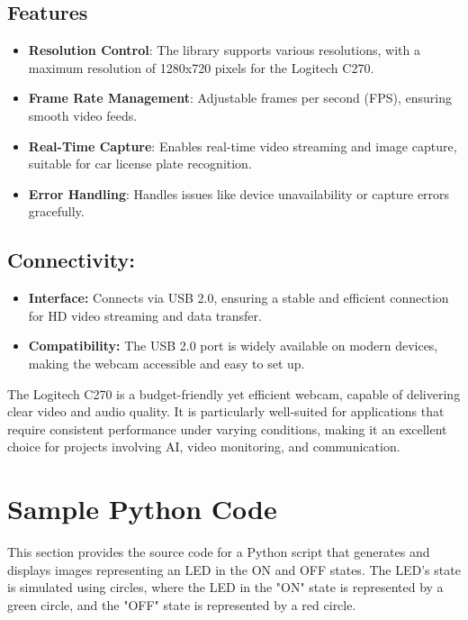 \subsection{Features}

\begin{itemize}
	\item \textbf{Resolution Control}: The library supports various resolutions, with a maximum resolution of 1280x720 pixels for the Logitech C270.
	\item \textbf{Frame Rate Management}: Adjustable frames per second (FPS), ensuring smooth video feeds.
	\item \textbf{Real-Time Capture}: Enables real-time video streaming and image capture, suitable for car license plate recognition.
	\item \textbf{Error Handling}: Handles issues like device unavailability or capture errors gracefully.
\end{itemize}

\subsection{Connectivity:}
\begin{itemize}
	\item \textbf{Interface:} Connects via USB 2.0, ensuring a stable and efficient connection for HD video streaming and data transfer.
	
	\item \textbf{Compatibility:} The USB 2.0 port is widely available on modern devices, making the webcam accessible and easy to set up.
\end{itemize}

The Logitech C270 is a budget-friendly yet efficient webcam, capable of delivering clear video and audio quality. It is particularly well-suited for applications that require consistent performance under varying conditions, making it an excellent choice for projects involving AI, video monitoring, and communication.



\section{Sample Python Code}

This section provides the source code for a Python script that generates and displays images representing an LED in the ON and OFF states. The LED's state is simulated using circles, where the LED in the "ON" state is represented by a green circle, and the "OFF" state is represented by a red circle.


